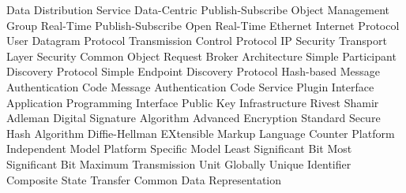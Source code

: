      {Data Distribution Service}
    {Data-Centric Publish-Subscribe}
     {Object Management Group}
    {Real-Time Publish-Subscribe}
    {Open Real-Time Ethernet}
      {Internet Protocol}
     {User Datagram Protocol}
     {Transmission Control Protocol}
   {IP Security}
     {Transport Layer Security}
   {Common Object Request Broker Architecture}
    {Simple Participant Discovery Protocol}
    {Simple Endpoint Discovery Protocol}
    {Hash-based Message Authentication Code}
     {Message Authentication Code}
     {Service Plugin Interface}
     {Application Programming Interface}
     {Public Key Infrastructure}
     {Rivest Shamir Adleman}
     {Digital Signature Algorithm}
     {Advanced Encryption Standard}
     {Secure Hash Algorithm}
      {Diffie-Hellman}
     {EXtensible Markup Language}
     {Counter}
     {Platform Independent Model}
     {Platform Specific Model}
     {Least Significant Bit}
     {Most Significant Bit}
     {Maximum Transmission Unit}
    {Globally Unique Identifier}
     {Composite State Transfer}
     {Common Data Representation}
